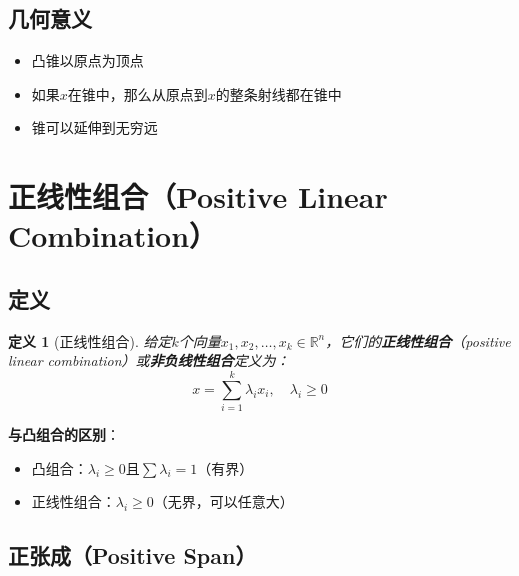 \documentclass[12pt,a4paper]{article}
\newtheorem{definition}{定义}
\begin{document}
\subsection{几何意义}

\begin{itemize}
\item 凸锥以原点为顶点
\item 如果$x$在锥中，那么从原点到$x$的整条射线都在锥中
\item 锥可以延伸到无穷远
\end{itemize}

\begin{center}
\end{center}

\section{正线性组合（Positive Linear Combination）}

\subsection{定义}

\begin{definition}[正线性组合]
给定$k$个向量$x_1, x_2, \ldots, x_k \in \mathbb{R}^n$，它们的\textbf{正线性组合}（positive linear combination）或\textbf{非负线性组合}定义为：
\begin{equation}
x = \sum_{i=1}^k \lambda_i x_i, \quad \lambda_i \geq 0
\end{equation}
\end{definition}

\textbf{与凸组合的区别}：
\begin{itemize}
\item 凸组合：$\lambda_i \geq 0$且$\sum \lambda_i = 1$（有界）
\item 正线性组合：$\lambda_i \geq 0$（无界，可以任意大）
\end{itemize}

\subsection{正张成（Positive Span）}
\end{document}
